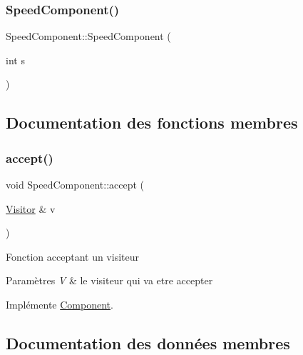 \subsubsection{\texorpdfstring{Speed\+Component()}{SpeedComponent()}}
{\footnotesize\ttfamily Speed\+Component\+::\+Speed\+Component (\begin{DoxyParamCaption}\item[{int}]{s }\end{DoxyParamCaption})\hspace{0.3cm}{\ttfamily [inline]}}



\subsection{Documentation des fonctions membres}
\mbox{\label{structSpeedComponent_a6857d2108ab631e63a9040bf77a8b366}} 
\subsubsection{\texorpdfstring{accept()}{accept()}}
{\footnotesize\ttfamily void Speed\+Component\+::accept (\begin{DoxyParamCaption}\item[{\hyperlink{classVisitor}{Visitor} \&}]{v }\end{DoxyParamCaption})\hspace{0.3cm}{\ttfamily [virtual]}}

Fonction acceptant un visiteur


\begin{DoxyParams}{Paramètres}
{\em V} & le visiteur qui va etre accepter \\
\hline
\end{DoxyParams}


Implémente \hyperlink{structComponent_a1d42068fda4a9bf6571810f669b3bb21}{Component}.



\subsection{Documentation des données membres}
\mbox{\label{structSpeedComponent_aedd25677bc7888cab4eac92c444e0cdb}} 
